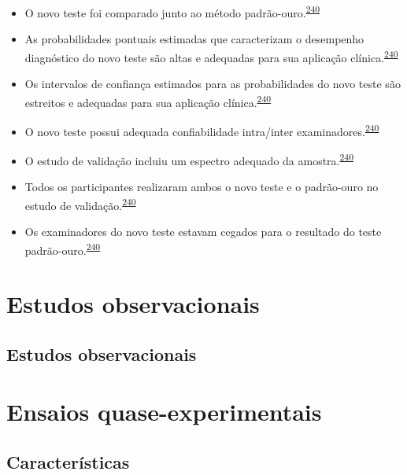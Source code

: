 \documentclass[
  a4paper,
]{book}
\begin{document}
\begin{itemize}
\item
  O novo teste foi comparado junto ao método padrão-ouro.\textsuperscript{\protect\hyperlink{ref-greenhalgh1997b}{240}}
\item
  As probabilidades pontuais estimadas que caracterizam o desempenho diagnóstico do novo teste são altas e adequadas para sua aplicação clínica.\textsuperscript{\protect\hyperlink{ref-greenhalgh1997b}{240}}
\item
  Os intervalos de confiança estimados para as probabilidades do novo teste são estreitos e adequadas para sua aplicação clínica.\textsuperscript{\protect\hyperlink{ref-greenhalgh1997b}{240}}
\item
  O novo teste possui adequada confiabilidade intra/inter examinadores.\textsuperscript{\protect\hyperlink{ref-greenhalgh1997b}{240}}
\item
  O estudo de validação incluiu um espectro adequado da amostra.\textsuperscript{\protect\hyperlink{ref-greenhalgh1997b}{240}}
\item
  Todos os participantes realizaram ambos o novo teste e o padrão-ouro no estudo de validação.\textsuperscript{\protect\hyperlink{ref-greenhalgh1997b}{240}}
\item
  Os examinadores do novo teste estavam cegados para o resultado do teste padrão-ouro.\textsuperscript{\protect\hyperlink{ref-greenhalgh1997b}{240}}
\end{itemize}

\hypertarget{estudos-observacionais}{%
\chapter{\texorpdfstring{\textbf{Estudos observacionais}}{Estudos observacionais}}\label{estudos-observacionais}}

\hypertarget{observacionais}{%
\section{Estudos observacionais}\label{observacionais}}

\hypertarget{ensaios-quase-experimentais}{%
\chapter{\texorpdfstring{\textbf{Ensaios quase-experimentais}}{Ensaios quase-experimentais}}\label{ensaios-quase-experimentais}}

\hypertarget{caracteristicas}{%
\section{Características}\label{caracteristicas}}
\end{document}
